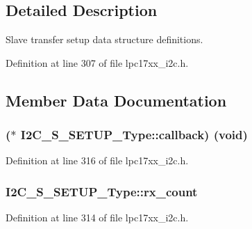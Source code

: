 \subsection{Detailed Description}
Slave transfer setup data structure definitions. 

Definition at line 307 of file lpc17xx\+\_\+i2c.\+h.



\subsection{Member Data Documentation}
\subsubsection[{\texorpdfstring{callback}{callback}}]{($\ast$ I2\+C\+\_\+\+S\+\_\+\+S\+E\+T\+U\+P\+\_\+\+Type\+::callback) ({\bf void})}\hypertarget{struct_i2_c___s___s_e_t_u_p___type_aba1fe7a9b97729abb130e7a9558964db}{}\label{struct_i2_c___s___s_e_t_u_p___type_aba1fe7a9b97729abb130e7a9558964db}


Definition at line 316 of file lpc17xx\+\_\+i2c.\+h.

\subsubsection[{\texorpdfstring{rx\+\_\+count}{rx_count}}]{ I2\+C\+\_\+\+S\+\_\+\+S\+E\+T\+U\+P\+\_\+\+Type\+::rx\+\_\+count}\hypertarget{struct_i2_c___s___s_e_t_u_p___type_a63f72aed2db5a0faa6fe4c55b6777781}{}\label{struct_i2_c___s___s_e_t_u_p___type_a63f72aed2db5a0faa6fe4c55b6777781}


Definition at line 314 of file lpc17xx\+\_\+i2c.\+h.


